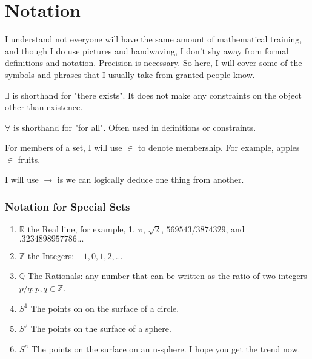 \chapter{Notation}\label{ch:notation}
I understand not everyone will have the same amount of mathematical training, and though I do use pictures and handwaving, I don't shy away from formal definitions and notation.  Precision is necessary.  So here, I will cover some of the symbols and phrases that I usually take from granted people know.

\begin{definition}[Exists]
  $\exists$ is shorthand for "there exists".  It does not make any constraints on the object other than existence.
\end{definition}

\begin{definition}
  $\forall$ is shorthand for "for all".  Often used in definitions or constraints.
\end{definition}

\begin{definition}[In]
  For members of a set, I will use $\in$ to denote membership.  For example, apples $\in$ fruits.
\end{definition}

\begin{definition}[Implies]
  I will use $\rightarrow$ is we can logically deduce one thing from another.
\end{definition}

\subsection{Notation for Special Sets}
\begin{enumerate}
  \item $\mathbb{R}$ the Real line, for example, 1, $\pi$, $\sqrt{2}$, $569543/3874329$, and $.3234898957786...$
  \item $\mathbb{Z}$ the Integers: $-1, 0, 1, 2,...$
  \item $\mathbb{Q}$ The Rationals: any number that can be written as the ratio of two integers $p/q : p,q \in \mathbb{Z}$.
  \item $S^1$ The points on on the surface of a circle.
  \item $S^2$ The points on the surface of a sphere.
  \item $S^n$ The points on the surface on an n-sphere.  I hope you get the trend now.
\end{enumerate}
